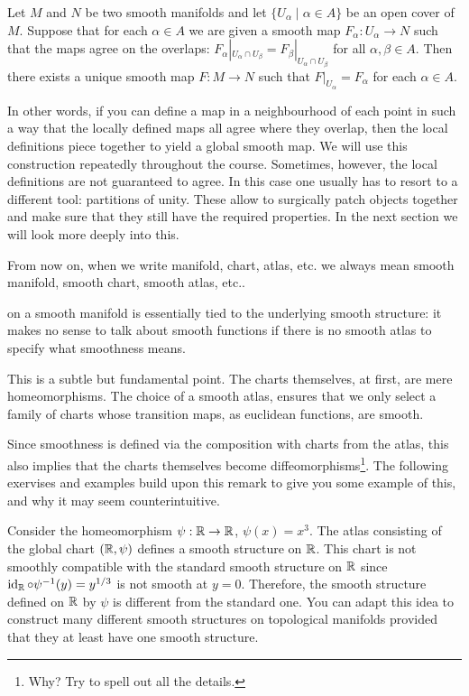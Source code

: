\begin{proposition}
  Let $M$ and $N$ be two smooth manifolds and let $\{U_\alpha\mid\alpha\in A\}$ be an open cover of $M$.
  Suppose that for each $\alpha\in A$ we are given a smooth map $F_
    \alpha:U_\alpha\to N$ such that the maps agree on the overlaps: $F_\alpha|_{U_\alpha\cap U_\beta} = F_\beta|_{U_\alpha\cap U_\beta}$ for all $\alpha,\beta\in A$.
  Then there exists a unique smooth map $F:M\to N$ such that $F|_{U_\alpha} = F_\alpha$ for each $\alpha\in A$.
\end{proposition}

In other words, if you can define a map in a neighbourhood of each point in such a way that the locally defined maps all agree where they overlap, then the local definitions piece together to yield a global smooth map.
We will use this construction repeatedly throughout the course.
Sometimes, however, the local definitions are not guaranteed to agree. In this case one usually has to resort to a different tool: partitions of unity.
These allow to surgically patch objects together and make sure that they still have the required properties.
In the next section we will look more deeply into this.

\begin{tcolorbox}
  From now on, when we write manifold, chart, atlas, etc. we always mean smooth manifold, smooth chart, smooth atlas, etc..
\end{tcolorbox}

 on a smooth manifold is essentially tied to the underlying smooth structure: it makes no sense to talk about smooth functions if there is no smooth atlas to specify what smoothness means.

This is a subtle but fundamental point. The charts themselves, at first, are mere homeomorphisms.
The choice of a smooth atlas, ensures that we only select a family of charts whose transition maps, as euclidean functions, are smooth.

Since smoothness is defined via the composition with charts from the atlas, this also implies that the charts themselves become diffeomorphisms\footnote{Why? Try to spell out all the details.}. The following exervises and examples build upon this remark to give you some example of this, and why it may seem counterintuitive.

\begin{example}
  Consider the homeomorphism $\psi:\mathbb{R}\to\mathbb{R}$, $\psi(x) = x^3$.
  The atlas consisting of the global chart $(\mathbb{R}, \psi)$ defines a smooth structure on $\mathbb{R}$.
  This chart is not smoothly compatible with the standard smooth structure on $\mathbb{R}$ since $\operatorname{id}_{\mathbb{R}} \circ \psi^{-1} (y) = y^{1/3}$ is not smooth at $y=0$.
  Therefore, the smooth structure defined on $\mathbb{R}$ by $\psi$ is different from the standard one.
  You can adapt this idea to construct many different smooth structures on topological manifolds provided that they at least have one smooth structure.
\end{example}

